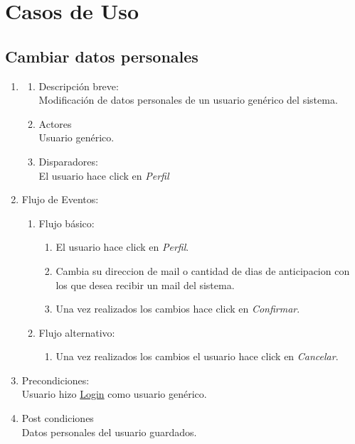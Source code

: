 \documentclass[a4paper,11pt]{article}
\begin{document}
\pagebreak

\section{Casos de Uso}

\subsection{Cambiar datos personales}
\begin{enumerate}

    \item
    \begin{enumerate}
    \item Descripción breve: \\
        Modificación de datos personales de un usuario genérico del sistema.
    \item Actores \\
        Usuario genérico.
    \item Disparadores: \\
        El usuario hace click en \emph{Perfil}
    \end{enumerate}

    \item Flujo de Eventos:
    \begin{enumerate}

        \item Flujo básico:
            \begin{enumerate}
                \item El usuario hace click en \emph{Perfil}.
                \item Cambia su direccion de mail o cantidad de dias de anticipacion con los que desea recibir un mail del sistema.
                \item Una vez realizados los cambios hace click en \emph{Confirmar}.
            \end{enumerate}
        \item Flujo alternativo:
            \begin{enumerate}
                \item Una vez realizados los cambios el usuario hace click en \emph{Cancelar}.
            \end{enumerate}
    \end{enumerate}

    \item Precondiciones: \\
        Usuario hizo \underline{Login} como usuario genérico.

    \item Post condiciones \\
        Datos personales del usuario guardados.

\end{enumerate}
\end{document}
